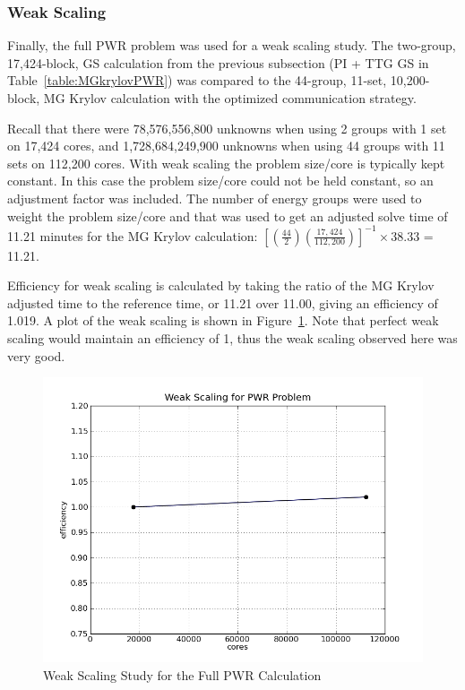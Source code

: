 \subsubsection{Weak Scaling}
Finally, the full PWR problem was used for a weak scaling study. The two-group, 17,424-block, GS calculation from the previous subsection (PI + TTG GS in Table~\ref{table:MGkrylovPWR}) was compared to the 44-group, 11-set, 10,200-block, MG Krylov calculation with the optimized communication strategy. 

Recall that there were 78,576,556,800 unknowns when using 2 groups with 1 set on 17,424 cores, and 1,728,684,249,900 unknowns when using 44 groups with 11 sets on 112,200 cores. With weak scaling the problem size/core is typically kept constant. In this case the problem size/core could not be held constant, so an adjustment factor was included. The number of energy groups were used to weight the problem size/core and that was used to get an adjusted solve time of 11.21 minutes for the MG Krylov calculation: $[(\frac{44}{2})(\frac{17,424}{112,200})]^{-1}\times38.33$ = 11.21. 

Efficiency for weak scaling is calculated by taking the ratio of the MG Krylov adjusted time to the reference time, or 11.21 over 11.00, giving an efficiency of 1.019. A plot of the weak scaling is shown in Figure~\ref{fig:PWRweakScaling}. Note that perfect weak scaling would maintain an efficiency of 1, thus the weak scaling observed here was very good. 
%
\begin{figure}[!h]
  \begin{center}
    \includegraphics [width=.8\textwidth, height=0.48\textheight ] {PWRmyWeakScaling}
  \end{center}
  \caption{Weak Scaling Study for the Full PWR Calculation}
  \label{fig:PWRweakScaling}
\end{figure}

